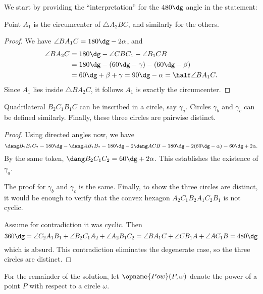 \documentclass[11pt]{scrartcl}
\begin{document}
We start by providing the ``interpretation'' for the $480\dg$ angle in the statement:
\begin{claim*}
  Point $A_1$ is the circumcenter of $\triangle A_2BC$, and similarly for the others.
\end{claim*}
\begin{proof}
  We have $\angle BA_1C = 180\dg - 2\alpha$, and
  \begin{align*}
    \angle BA_2C &= 180\dg - \angle CBC_1 - \angle B_1CB \\
    &= 180\dg - \left( 60\dg - \gamma \right) - \left( 60\dg - \beta \right) \\
    &= 60\dg + \beta + \gamma = 90\dg - \alpha = \half \angle BA_1 C.
  \end{align*}
  Since $A_1$ lies inside $\triangle BA_2C$, it follows $A_1$ is exactly the circumcenter.
\end{proof}

\begin{claim*}
  Quadrilateral $B_2C_1B_1C$ can be inscribed in a circle, say $\gamma_a$.
  Circles $\gamma_b$ and $\gamma_c$ can be defined similarly.
  Finally, these three circles are pairwise distinct.
\end{claim*}
\begin{proof}
  Using directed angles now, we have
  \[ \dang B_2B_1C_2 = 180\dg-\dang AB_1B_2
    = 180\dg - 2 \dang ACB = 180\dg-2(60\dg-\alpha) = 60\dg+2\alpha. \]
  By the same token, $\dang B_2C_1C_2 = 60\dg+2\alpha$.
  This establishes the existence of $\gamma_a$.

  The proof for $\gamma_b$ and $\gamma_c$ is the same.
  Finally, to show the three circles are distinct, it would be enough to
  verify that the convex hexagon $A_2C_1B_2A_1C_2B_1$ is not cyclic.

  Assume for contradiction it was cyclic. Then
  \[ 360\dg = \angle C_2A_1B_1 + \angle B_2C_1A_2 + \angle A_2B_1C_2
    = \angle BA_1C + \angle CB_1A + \angle AC_1B = 480\dg \]
  which is absurd.
  This contradiction eliminates the degenerate case, so the three circles are distinct.
\end{proof}

For the remainder of the solution, let $\opname{Pow}(P, \omega)$
denote the power of a point $P$ with respect to a circle $\omega$.
\end{document}
